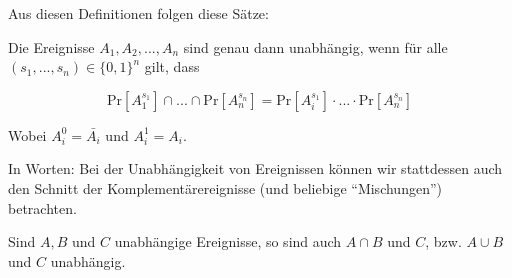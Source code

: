 Aus diesen Definitionen folgen diese Sätze:

\begin{satz}[Satz]
    Die Ereignisse $A_1, A_2, ... , A_n$ sind genau dann unabhängig, wenn für alle 
    $(s_1, ... , s_n) \in \{0, 1\}^n$ gilt, dass
    
    $$\text{Pr}[A_1^{s_1}] \cap ... \cap \text{Pr}[A_n^{s_n}] = \text{Pr}[A_i^{s_1}] \cdot ... \cdot \text{Pr}[A_n^{s_n}]$$

    Wobei $A_i^0 = \bar{A_i}$ und $A_i^1 = A_i$.
\end{satz}
\bigskip

In Worten: Bei der Unabhängigkeit von Ereignissen können wir stattdessen auch den Schnitt der 
Komplementärereignisse (und beliebige “Mischungen”) betrachten.

\begin{satz}[Satz]
    Sind $A, B $ und $C$ unabhängige Ereignisse, so sind auch $A \cap B$ und $C$, bzw. $A \cup B$ und 
    $C$ unabhängig.
\end{satz}